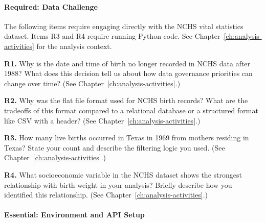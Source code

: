 \begin{Form}
\paragraph{Required: Data Challenge}
\label{sec:assess-required}

The following items require engaging directly with the NCHS vital
statistics dataset. Items R3 and R4 require running Python code.
See Chapter~\ref{ch:analysis-activities} for the analysis context.

\vs

\noindent\textbf{R1.} Why is the date and time of birth no longer
recorded in NCHS data after 1988? What does this decision tell us
about how data governance priorities can change over time?
(See Chapter~\ref{ch:analysis-activities}.)\\[4pt]
\TextField[name=r1,width=\linewidth,height=3cm,multiline=true,
           bordercolor=black]{}

\vs

\noindent\textbf{R2.} Why was the flat file format used for NCHS
birth records? What are the tradeoffs of this format compared to a
relational database or a structured format like CSV with a header?
(See Chapter~\ref{ch:analysis-activities}.)\\[4pt]
\TextField[name=r2,width=\linewidth,height=3cm,multiline=true,
           bordercolor=black]{}

\vs

\noindent\textbf{R3.} How many live births occurred in Texas in 1969
from mothers residing in Texas? State your count and describe the
filtering logic you used.
(See Chapter~\ref{ch:analysis-activities}.)\\[4pt]
\TextField[name=r3,width=\linewidth,height=3cm,multiline=true,
           bordercolor=black]{}

\vs

\noindent\textbf{R4.} What socioeconomic variable in the NCHS dataset
shows the strongest relationship with birth weight in your analysis?
Briefly describe how you identified this relationship.
(See Chapter~\ref{ch:analysis-activities}.)\\[4pt]
\TextField[name=r4,width=\linewidth,height=3cm,multiline=true,
           bordercolor=black]{}

\paragraph{Essential: Environment and API Setup}
\label{sec:assess-essential}


\end{Form}
